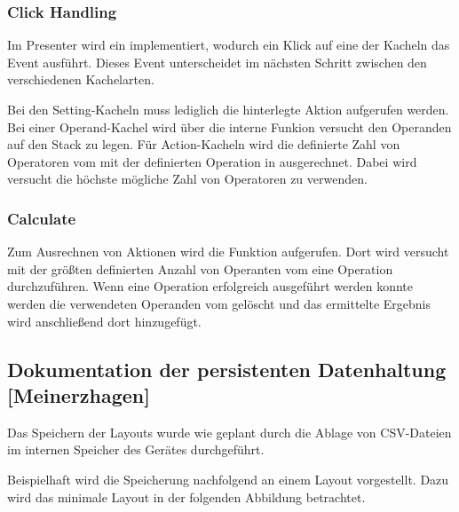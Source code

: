\subsubsection{Click Handling}

Im Presenter wird ein  implementiert, wodurch ein Klick auf eine der Kacheln das Event  ausführt. Dieses Event unterscheidet im nächsten Schritt zwischen den verschiedenen Kachelarten.

Bei den Setting-Kacheln muss lediglich die hinterlegte Aktion aufgerufen werden. Bei einer Operand-Kachel wird über die interne Funkion  versucht den Operanden auf den Stack zu legen. Für Action-Kacheln wird die definierte Zahl von Operatoren vom  mit der definierten Operation in  ausgerechnet. Dabei wird versucht die höchste mögliche Zahl von Operatoren zu verwenden.

\subsubsection{Calculate}

Zum Ausrechnen von Aktionen wird die Funktion  aufgerufen. Dort wird versucht mit der größten definierten Anzahl von Operanten vom  eine Operation durchzuführen. Wenn eine Operation erfolgreich ausgeführt werden konnte werden die verwendeten Operanden vom  gelöscht und das ermittelte Ergebnis wird anschließend dort hinzugefügt.

\subsection{Dokumentation der persistenten Datenhaltung [Meinerzhagen]}
\label{subsection:dokumentation-der-persistenten-datenhaltung}

Das Speichern der Layouts wurde wie geplant durch die Ablage von CSV-Dateien im internen Speicher des Gerätes durchgeführt. 

Beispielhaft wird die Speicherung nachfolgend an einem Layout vorgestellt. Dazu wird das minimale Layout in der folgenden Abbildung betrachtet.  

